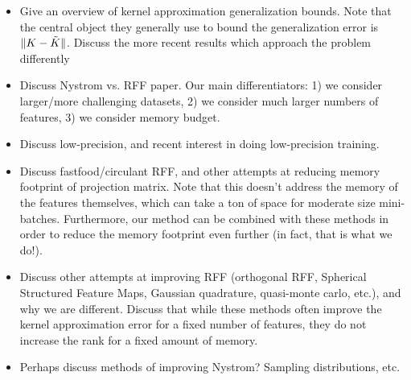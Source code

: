 \begin{itemize}
	\item Give an overview of kernel approximation generalization bounds.  Note that the central object they generally use to bound the generalization error is $\|K-\tilde{K}\|$.  Discuss the more recent results which approach the problem differently 
	\item Discuss Nystrom vs. RFF paper.  Our main differentiators: 1) we consider larger/more challenging datasets, 2) we consider much larger numbers of features, 3) we consider memory budget.
	\item Discuss low-precision, and recent interest in doing low-precision training.
	\item Discuss fastfood/circulant RFF, and other attempts at reducing memory footprint of projection matrix.  Note that this doesn't address the memory of the features themselves, which can take a ton of space for moderate size mini-batches. Furthermore, our method can be combined with these methods in order to reduce the memory footprint even further (in fact, that is what we do!).
	\item Discuss other attempts at improving RFF (orthogonal RFF, Spherical Structured Feature Maps, Gaussian quadrature, quasi-monte carlo, etc.), and why we are different.  Discuss that while these methods often improve the kernel approximation error for a fixed number of features, they do not increase the rank for a fixed amount of memory.
	\item Perhaps discuss methods of improving Nystrom?  Sampling distributions, etc.
\end{itemize}